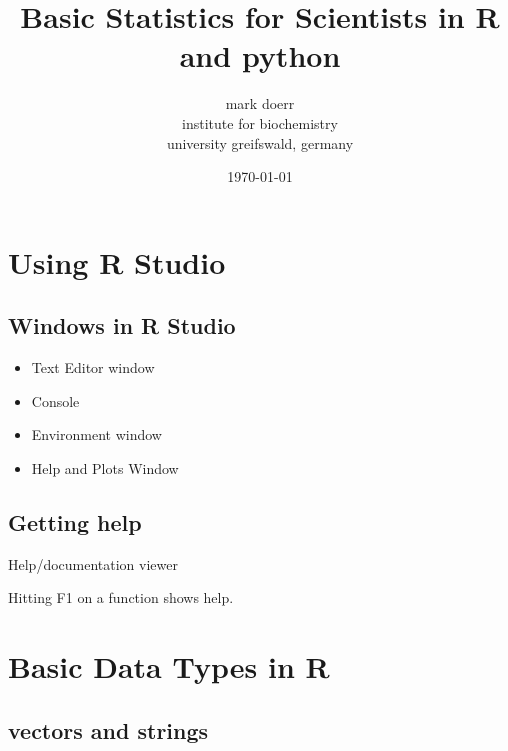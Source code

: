 \documentclass[a4paper,10pt]{book}\usepackage[]{graphicx}\usepackage[]{color}
\title{Basic Statistics for Scientists in R and python}
\date{\today}
\author{mark doerr \\ institute for biochemistry \\ university greifswald, germany}
\begin{document}
\maketitle
{}

\chapter{Using R Studio}

\section{Windows in R Studio}

\begin{itemize}
 \item Text Editor window 
 \item Console
 \item Environment window
 \item Help and Plots Window
\end{itemize}

\section{Getting help}

Help/documentation viewer

Hitting F1 on a function shows help.

\chapter{Basic Data Types in R}

\section{vectors and strings}
\end{document}

